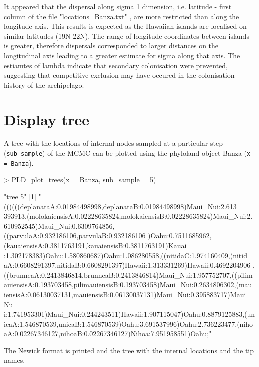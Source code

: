 \documentclass[a4paper]{article}
\begin{document}
It appeared that the dispersal along sigma 1 dimension, i.e. latitude - first column of the file "locations\_Banza.txt" , are more restricted than along the longitude axis.
This results is expected as the Hawaiian islands are localised on similar latitudes (19N-22N).
The range of longitude coordinates between islands is greater, therefore dispersals corresponded to larger distances on the longitudinal axis leading to a greater estimate for sigma along that axis.
The estiamtes of lambda indicate that secondary colonisation were prevented, suggesting that competitive exclusion may have occured in the colonisation history of the archipelago.

\newpage
\section{Display tree}
\hspace{12pt} A tree with the locations of internal nodes sampled at a particular step (\texttt{sub\_sample}) of the MCMC can be plotted using the phyloland object Banza (\texttt{x = Banza}).
\begin{Schunk}
\begin{Sinput}
> PLD_plot_trees(x = Banza, sub_sample = 5)
\end{Sinput}

\begin{Soutput}
[1] "tree 5"
[1] "((((((deplanataA:0.01984498998,deplanataB:0.01984498998)Maui_Nui:2.613
393913,(molokaiensisA:0.02228635824,molokaiensisB:0.02228635824)Maui_Nui:2.
610952545)Maui_Nui:0.6309764856,((parvulaA:0.932186106,parvulaB:0.932186106
)Oahu:0.7511685962,(kauaiensisA:0.3811763191,kauaiensisB:0.3811763191)Kauai
:1.302178383)Oahu:1.580860687)Oahu:1.086280558,((nitidaC:1.974160409,(nitid
aA:0.6608291397,nitidaB:0.6608291397)Hawaii:1.313331269)Hawaii:0.4692204906
,((brunneaA:0.2413846814,brunneaB:0.2413846814)Maui_Nui:1.957752707,((pilim
auiensisA:0.193703458,pilimauiensisB:0.193703458)Maui_Nui:0.2634806302,(mau
iensisA:0.06130037131,mauiensisB:0.06130037131)Maui_Nui:0.395883717)Maui_Nu
i:1.741953301)Maui_Nui:0.244243511)Hawaii:1.907115047)Oahu:0.8879125883,(un
icaA:1.546870539,unicaB:1.546870539)Oahu:3.691537996)Oahu:2.736223477,(niho
aA:0.02267346127,nihoaB:0.02267346127)Nihoa:7.951958551)Oahu;"
\end{Soutput}
\end{Schunk}
\hspace{12pt}The Newick format is printed and the tree with the internal locations and the tip names.\\
\end{document}
